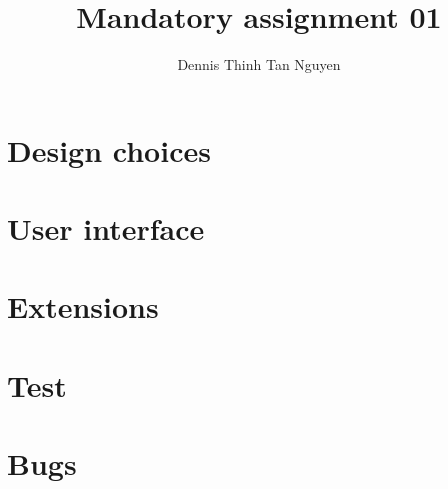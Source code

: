\documentclass[]{article}
\title{Mandatory assignment 01}
\author{Dennis Thinh Tan Nguyen}
\begin{document}
\maketitle
\newpage
\tableofcontents

\newpage
\section{Design choices}
\section{User interface}
\section{Extensions}
\section{Test}
\section{Bugs}
\end{document}
